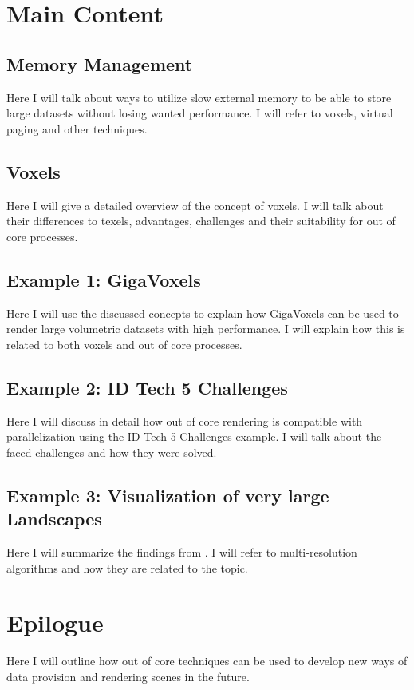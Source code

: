 \chapter{Main Content}
\label{ch:MainContent}

\section{Memory Management}
Here I will talk about ways to utilize slow external memory to be able to store large datasets without losing wanted performance. I will refer to voxels, virtual paging and other techniques.

\section{Voxels}

Here I will give a detailed overview of the concept of voxels. I will talk about their differences to texels, advantages, challenges and their suitability for out of core processes.

\section{Example 1: GigaVoxels}
Here I will use the discussed concepts to explain how GigaVoxels can be used to render large volumetric datasets with high performance. I will explain how this is related to both voxels and out of core processes.

\section{Example 2: ID Tech 5 Challenges}
Here I will discuss in detail how out of core rendering is compatible with parallelization using the ID Tech 5 Challenges example. I will talk about the faced challenges and how they were solved. 

\section{Example 3: Visualization of very large Landscapes}
Here I will summarize the findings from \cite{10.1007/978-3-540-40014-1_3}. I will refer to multi-resolution algorithms and how they are related to the topic.

\chapter{Epilogue}
\label{ch:Epilogue}

Here I will outline how out of core techniques can be used to develop new ways of data provision and rendering scenes in the future. 